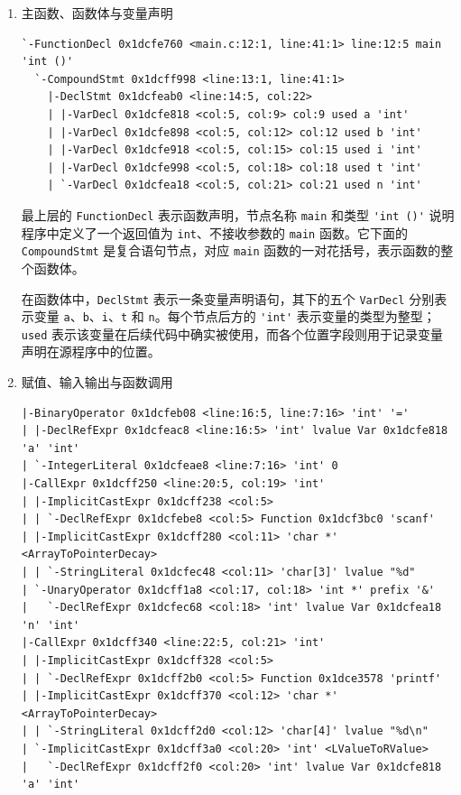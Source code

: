 \documentclass[UTF8,a4paper,10pt]{ctexart}
\begin{document}
\begin{enumerate}[label=\roman*.]
    \item 主函数、函数体与变量声明

\begin{lstlisting}[style=asm]
`-FunctionDecl 0x1dcfe760 <main.c:12:1, line:41:1> line:12:5 main 'int ()'
  `-CompoundStmt 0x1dcff998 <line:13:1, line:41:1>
    |-DeclStmt 0x1dcfeab0 <line:14:5, col:22>
    | |-VarDecl 0x1dcfe818 <col:5, col:9> col:9 used a 'int'
    | |-VarDecl 0x1dcfe898 <col:5, col:12> col:12 used b 'int'
    | |-VarDecl 0x1dcfe918 <col:5, col:15> col:15 used i 'int'
    | |-VarDecl 0x1dcfe998 <col:5, col:18> col:18 used t 'int'
    | `-VarDecl 0x1dcfea18 <col:5, col:21> col:21 used n 'int'
\end{lstlisting}

最上层的 \verb|FunctionDecl| 表示函数声明，节点名称 \verb|main| 和类型
\verb|'int ()'| 说明程序中定义了一个返回值为 \verb|int|、不接收参数的
\verb|main| 函数。它下面的 \verb|CompoundStmt| 是复合语句节点，对应
\verb|main| 函数的一对花括号，表示函数的整个函数体。

在函数体中，\verb|DeclStmt| 表示一条变量声明语句，其下的五个
\verb|VarDecl| 分别表示变量 \verb|a|、\verb|b|、\verb|i|、\verb|t| 和
\verb|n|。每个节点后方的 \verb|'int'| 表示变量的类型为整型；
\verb|used| 表示该变量在后续代码中确实被使用，而各个位置字段则用于记录变量
声明在源程序中的位置。

    \item 赋值、输入输出与函数调用

\begin{lstlisting}[style=asm]
|-BinaryOperator 0x1dcfeb08 <line:16:5, line:7:16> 'int' '='
| |-DeclRefExpr 0x1dcfeac8 <line:16:5> 'int' lvalue Var 0x1dcfe818 'a' 'int'
| `-IntegerLiteral 0x1dcfeae8 <line:7:16> 'int' 0
|-CallExpr 0x1dcff250 <line:20:5, col:19> 'int'
| |-ImplicitCastExpr 0x1dcff238 <col:5>
| | `-DeclRefExpr 0x1dcfebe8 <col:5> Function 0x1dcf3bc0 'scanf'
| |-ImplicitCastExpr 0x1dcff280 <col:11> 'char *' <ArrayToPointerDecay>
| | `-StringLiteral 0x1dcfec48 <col:11> 'char[3]' lvalue "%d"
| `-UnaryOperator 0x1dcff1a8 <col:17, col:18> 'int *' prefix '&'
|   `-DeclRefExpr 0x1dcfec68 <col:18> 'int' lvalue Var 0x1dcfea18 'n' 'int'
|-CallExpr 0x1dcff340 <line:22:5, col:21> 'int'
| |-ImplicitCastExpr 0x1dcff328 <col:5>
| | `-DeclRefExpr 0x1dcff2b0 <col:5> Function 0x1dce3578 'printf'
| |-ImplicitCastExpr 0x1dcff370 <col:12> 'char *' <ArrayToPointerDecay>
| | `-StringLiteral 0x1dcff2d0 <col:12> 'char[4]' lvalue "%d\n"
| `-ImplicitCastExpr 0x1dcff3a0 <col:20> 'int' <LValueToRValue>
|   `-DeclRefExpr 0x1dcff2f0 <col:20> 'int' lvalue Var 0x1dcfe818 'a' 'int'
\end{lstlisting}


\end{enumerate}
\end{document}
